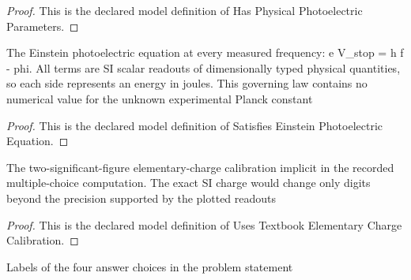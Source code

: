 \begin{proof}
  This is the declared model definition of Has Physical Photoelectric Parameters.
\end{proof}
\begin{definition}
  \label{def:physics:phyx-mini-0499:phyxminiproblems-problemphyxmini0499-satisfieseinsteinphotoelectricequation}
  The Einstein photoelectric equation at every measured frequency: e V\_stop = h f - phi. All terms are SI scalar readouts of dimensionally typed physical quantities, so each side represents an energy in joules. This governing law contains no numerical value for the unknown experimental Planck constant
\end{definition}
\begin{proof}
  This is the declared model definition of Satisfies Einstein Photoelectric Equation.
\end{proof}
\begin{definition}
  \label{def:physics:phyx-mini-0499:phyxminiproblems-problemphyxmini0499-usestextbookelementarychargecalibration}
  The two-significant-figure elementary-charge calibration implicit in the recorded multiple-choice computation. The exact SI charge would change only digits beyond the precision supported by the plotted readouts
\end{definition}
\begin{proof}
  This is the declared model definition of Uses Textbook Elementary Charge Calibration.
\end{proof}
\begin{definition}
  \label{def:physics:phyx-mini-0499:phyxminiproblems-problemphyxmini0499-answerchoice}
  Labels of the four answer choices in the problem statement
\end{definition}
